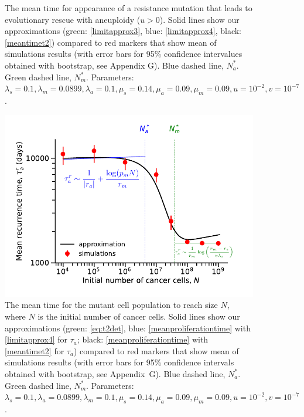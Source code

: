 \documentclass[12pt]{extarticle}
\begin{document}
\begin{appendices}
\begin{figure}
\caption{The mean time for appearance of a resistance mutation that leads to evolutionary rescue with aneuploidy ($u>0$). 
Solid lines show our approximations (green: \cref{limitapprox3}, blue: \cref{limitapprox4}, black: \cref{meantimet2}) compared to red markers that show mean of simulations results (with error bars for 95\% confidence intervalues obtained with bootstrap, see Appendix G).
Blue dashed line, $N_a^*$.
Green dashed line, $N_m^*$.
Parameters: $\lambda_s=0.1,\lambda_m=0.0899,\lambda_a=0.1,\mu_s=0.14,\mu_a=0.09,\mu_m=0.09, u=10^{-2}, v=10^{-7}$.} %
\label{EvolutionaryRescueTimeComplete}
\end{figure}
\begin{figure}
\vspace*{1\baselineskip}
\includegraphics[width=1\textwidth]{Figures/ProliferationTimeLarge.pdf} %
\caption{The mean time for the mutant cell population to reach size $N$, where $N$ is the initial number of cancer cells.
Solid lines show our approximations (green: \cref{eq:t2det}, blue: \cref{meanproliferationtime} with \cref{limitapprox4} for $\tau_a$; black: \cref{meanproliferationtime} with \cref{meantimet2} for $\tau_a$) compared to red markers that show mean of simulations results (with error bars for 95\% confidence intervals obtained with bootstrap, see Appendix G).
Blue dashed line, $N_a^*$.
Green dashed line, $N_m^*$.
Parameters: $\lambda_s=0.1,\lambda_a=0.0899,\lambda_m=0.1,\mu_s=0.14,\mu_a=0.09,\mu_m=0.09, u=10^{-2}, v=10^{-7}$.}
\label{ProliferationTimeLarge}
\end{figure}
\begin{figure}
\vspace*{1\baselineskip}

\end{figure}
\end{appendices}
\end{document}
